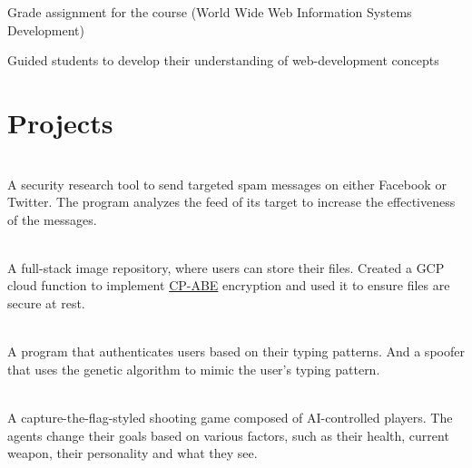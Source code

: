 \documentclass[]{resume-openfont}
\begin{document}
\smallSep
{}
\begin{tightemize}
    \item Grade assignment for the course (World Wide Web Information Systems Development)
    \item Guided students to develop their understanding of web-development concepts
\end{tightemize}


\sectionsep
%
%
\section{Projects}

\\
A security research tool to send targeted spam messages on either Facebook or Twitter. The program analyzes the feed of its target to increase the effectiveness of the messages.\\
\sectionsep
  
\hfill \\
A full-stack image repository, where users can store their files. Created a GCP cloud function to implement \href{https://www.cs.utexas.edu/~bwaters/publications/papers/cp-abe.pdf}{CP-ABE} encryption and used it to ensure files are secure at rest.\\
\sectionsep
  

\\
A program that authenticates users based on their typing patterns. And a spoofer that uses the genetic algorithm to mimic the user's typing pattern.\\
\sectionsep

\\
A capture-the-flag-styled shooting game composed of AI-controlled players. The agents change their goals based on various factors, such as their health, current weapon, their personality and what they see.\\
\sectionsep
  
\end{document}
